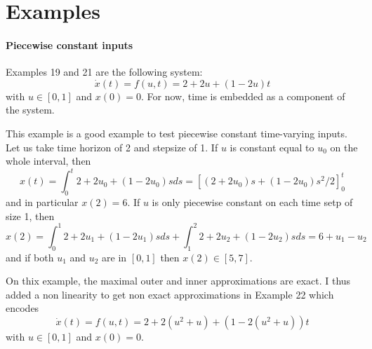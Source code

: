 \documentclass{llncs}
\begin{document}
\section{Examples}

\paragraph{Piecewise constant inputs}
Examples 19 and 21 are the following system:
\[ \dot x(t) = f(u,t) = 2+2u + (1-2u)t \]
with $u \in [0,1]$ and $x(0)=0$. For now, time is embedded as a component of the system. 

This example is a good example to test piecewise constant time-varying inputs. Let us take time horizon of 2 and stepsize of 1. 
If $u$ is constant equal to $u_0$ on the whole interval, then 
\[ x(t) = \int_0^t 2+2u_0 + (1-2u_0)s ds  = [ (2+2u_0)s+(1-2u_0)s^2/2]_0^t \]
and  in particular $x(2) = 6$.
If $u$ is only piecewise constant on each time setp of size 1, then 
\[ x(2) = \int_0^1 2+2u_1 + (1-2u_1)s ds + \int_1^2 2+2u_2 + (1-2u_2)s ds = 6 + u_1 - u_2\]
and if both $u_1$ and $u_2$ are in  $[0,1]$ then  $x(2) \in [5,7]$. 

On thix example, the maximal outer and inner approximations are exact. I thus added a non linearity to get non exact approximations in Example 22 which encodes \[ \dot x(t) = f(u,t) = 2+2(u^2+u) + (1-2(u^2+u))t \] with $u \in [0,1]$ and $x(0)=0$. 



%
\end{document}
